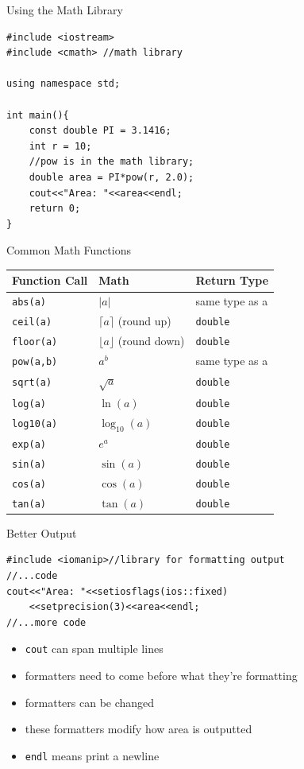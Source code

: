 \documentclass[xcolor={dvipsnames}]{beamer}
\begin{document}
\begin{frame}[fragile]{Using the Math Library}
\begin{verbatim}
#include <iostream>
#include <cmath> //math library

using namespace std;

int main(){
    const double PI = 3.1416;
    int r = 10;
    //pow is in the math library;
    double area = PI*pow(r, 2.0);
    cout<<"Area: "<<area<<endl;
    return 0;
}
\end{verbatim}
\end{frame} 

\begin{frame}{Common Math Functions}

\begin{tabularx}{\textwidth}{| X | X | X |}
\hline
\textbf{Function Call}& \textbf{Math} & \textbf{Return Type}\\
\hline
\hline
\texttt{abs(a)} & $\lvert a \rvert$ & same type as a\\
\texttt{ceil(a)} &$ \lceil a \rceil$ (round up) & \texttt{double}\\
\texttt{floor(a)}&$ \lfloor a \rfloor$ (round down) & \texttt{double}\\
\hline
\hline
\texttt{pow(a,b)} & $a^b$ & same type as a \\
\texttt{sqrt(a)} & $\sqrt{a}$ & \texttt{double}\\
\hline
\hline
\texttt{log(a)} & $\ln(a)$ & \texttt{double}\\
\texttt{log10(a)} & $\log_{10}(a)$ & \texttt{double}\\
\texttt{exp(a)} & $e^{a}$ & \texttt{double}\\
\hline
\hline
\texttt{sin(a)} & $\sin(a)$ & \texttt{double}\\
\texttt{cos(a)} & $\cos(a)$ & \texttt{double}\\
\texttt{tan(a)} & $\tan(a)$ & \texttt{double}\\
\hline
\end{tabularx}
\end{frame}

\begin{frame}[fragile]{Better Output}
\begin{verbatim}
#include <iomanip>//library for formatting output
//...code
cout<<"Area: "<<setiosflags(ios::fixed)
    <<setprecision(3)<<area<<endl;
//...more code
\end{verbatim}

\begin{block}{}
	\begin{itemize}
		\item \texttt{cout} can span multiple lines
		\item formatters need to come before what they're formatting
		\item formatters can be changed
		\item these formatters modify how area is outputted
		\item \texttt{endl} means print a newline
	\end{itemize}
\end{block}
\end{frame}
\end{document}
